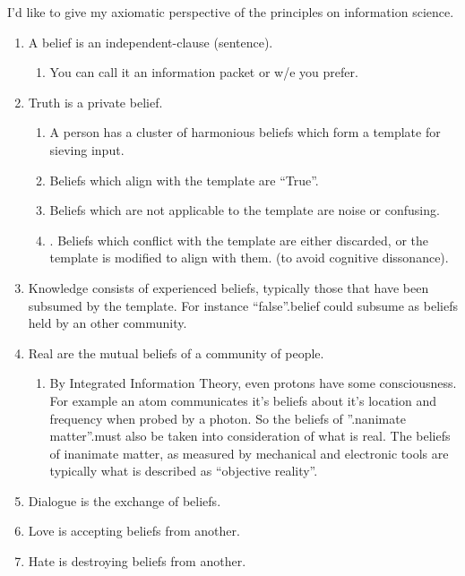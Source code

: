 I'd like to give my axiomatic perspective of the principles on
information science.

\begin{enumerate}
\item A belief is an independent-clause (sentence).
\begin{enumerate}
    \item  You can call it an information packet or w/e you prefer.
\end{enumerate}

\item Truth is a private belief.
\begin{enumerate}
    \item A person has a cluster of harmonious beliefs which form a template
for sieving input.
    \item Beliefs which align with the template are ``True''.
    \item  Beliefs which are not applicable to the template are noise or
confusing.
    \item.  Beliefs which conflict with the template are either discarded, or
the template is modified to align with them. (to avoid cognitive
dissonance).
\end{enumerate}

\item Knowledge consists of experienced beliefs, typically those that
have been subsumed by the template. For instance ``false''.belief could
subsume as beliefs held by an other community.

\item Real are the mutual beliefs of a community of people.
\begin{enumerate}
     \item By Integrated Information Theory, even protons have some
consciousness. For example an atom communicates it's beliefs about
it's location and frequency when probed by a photon. So the beliefs of
''.nanimate matter''.must also be taken into consideration of what is
real. The beliefs of inanimate matter, as measured by mechanical and
electronic tools are typically what is described as ``objective reality''.
\end{enumerate}

\item Dialogue is the exchange of beliefs.
\item Love is accepting beliefs from another.
\item Hate is destroying beliefs from another.
\end{enumerate}


